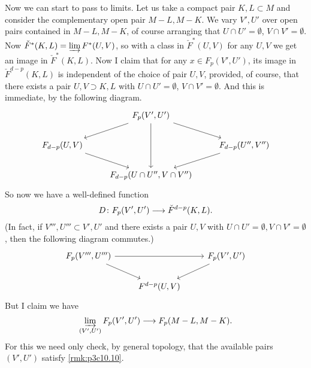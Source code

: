 \documentclass[../main]{subfiles}
\begin{document}
Now we can start to pass to limits. Let us take a compact pair $K,L \subset M$ and consider the complementary open pair $M-L,M-K$. We vary $V',U'$ over open pairs contained in $M-L,M-K$, of course arranging that $U \cap U' = \emptyset$, $V \cap V' = \emptyset$. Now $\check{F}^*(K,L) = \varinjlim F^*(U,V)$, so with a class in $\check{F}^*(U,V)$ for any $U,V$ we get an image in $\check{F}^*(K,L)$. Now I claim that for any $x \in F_p(V',U')$, its image in $\check{F}^{d-p}(K,L)$ is independent of the choice of pair $U,V$, provided, of course, that there exists a pair $U,V \supset K,L$ with $U \cap U' = \emptyset$, $V \cap V' = \emptyset$. And this is immediate, by the following diagram.
\[
\begin{tikzcd}
                             & {F_p(V', U')} \arrow[dd] \arrow[rd] \arrow[ld] &                                  \\
{F_{d - p}(U, V)} \arrow[rd] &                                                & {F_{d - p}(U'', V'')} \arrow[ld] \\
                             & {F_{d - p}(U \cap U'', V \cap V'')}            &                                 
\end{tikzcd}
\]
So now we have a well-defined function 
\[D \colon F_p(V',U') \longrightarrow \check{F}^{d-p}(K,L).\]
(In fact, if $V''',U''' \subset V',U'$ and there exists a pair $U,V$ with $U \cap U' = \emptyset, V \cap V' = \emptyset$, then the following diagram commutes.)
\[
\begin{tikzcd}
{F_p(V''', U''')} \arrow[rr] \arrow[rd] &                   & {F_p(V', U')} \arrow[ld] \\
                                        & {F^{d - p}(U, V)} &                         
\end{tikzcd}
\]
But I claim we have
\[\varinjlim_{(V',U')} F_p(V',U') \longrightarrow F_p(M-L,M-K).\]
For this we need only check, by general topology, that the available pairs $(V',U')$ satisfy \ref{rmk:p3c10.10}.
\end{document}
